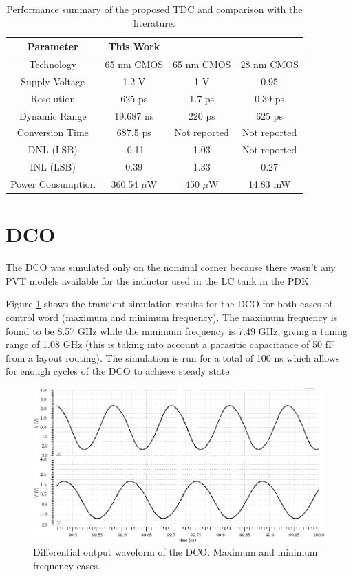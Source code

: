 \begin{table}[H]
    \centering
    \caption{Performance summary of the proposed TDC and comparison with the literature.}
    \label{tab:TDC_performance_summary}
    \begin{tabular}{|c|c|c|c|}
        \hline
        Parameter & This Work & \cite{MohammadAmin2022} & \cite{Meng2025}\\
        \hline
        Technology & 65 nm CMOS & 65 nm CMOS & 28 nm CMOS \\
        Supply Voltage & 1.2 V & 1 V & 0.95 \\
        Resolution & 625 ps & 1.7 ps & 0.39 ps\\
        Dynamic Range & 19.687 ns & 220 ps & 625 ps \\
        Conversion Time & 687.5 ps & Not reported &  Not reported \\
        DNL (LSB) & -0.11 & 1.03 & Not reported \\
        INL (LSB) & 0.39 & 1.33 & 0.27 \\
        Power Consumption & 360.54 $\mu$W & 450 $\mu$W & 14.83 mW \\
        \hline
    \end{tabular}
\end{table}

\section{DCO}
The DCO was simulated only on the nominal corner because there wasn't any PVT models available for the inductor used in the LC tank in the PDK.

Figure \ref{fig:DCO_TRAN} shows the transient simulation results for the DCO for both cases of control word (maximum and minimum frequency). The maximum frequency is found to be
8.57 GHz while the minimum frequency is 7.49 GHz, giving a tuning range of 1.08 GHz (this is taking into account a parasitic capacitance of 50 fF from a layout routing). The simulation
is run for a total of 100 ns which allows for enough cycles of the DCO to achieve steady state.

\begin{figure}[H]
    \centering
    \includegraphics[width=1\textwidth]{figures/DCO_TRAN.png}
    \caption{Differential output waveform of the DCO. Maximum and minimum frequency cases.}
    \label{fig:DCO_TRAN}
\end{figure}


